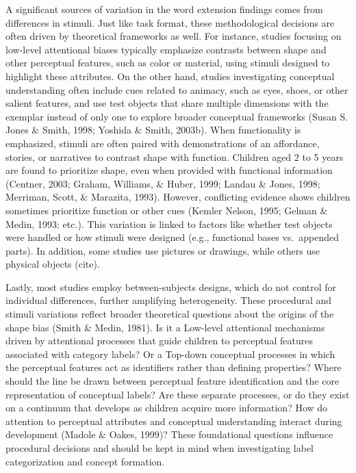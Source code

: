 \documentclass[10pt, letterpaper]{article}
\begin{document}
A significant sources of variation in the word extension findings comes
from differences in stimuli. Just like task format, these methodological
decisions are often driven by theoretical frameworks as well. For
instance, studies focusing on low-level attentional biases typically
emphasize contrasts between shape and other perceptual features, such as
color or material, using stimuli designed to highlight these attributes.
On the other hand, studies investigating conceptual understanding often
include cues related to animacy, such as eyes, shoes, or other salient
features, and use test objects that share multiple dimensions with the
exemplar instead of only one to explore broader conceptual frameworks
(Susan S. Jones \& Smith, 1998; Yoshida \& Smith, 2003b). When
functionality is emphasized, stimuli are often paired with
demonstrations of an affordance, stories, or narratives to contrast
shape with function. Children aged 2 to 5 years are found to prioritize
shape, even when provided with functional information (Centner, 2003;
Graham, Williams, \& Huber, 1999; Landau \& Jones, 1998; Merriman,
Scott, \& Marazita, 1993). However, conflicting evidence shows children
sometimes prioritize function or other cues (Kemler Nelson, 1995; Gelman
\& Medin, 1993; etc.). This variation is linked to factors like whether
test objects were handled or how stimuli were designed (e.g., functional
bases vs.~appended parts). In addition, some studies use pictures or
drawings, while others use physical objects (cite).

Lastly, most studies employ between-subjects designs, which do not
control for individual differences, further amplifying heterogeneity.
These procedural and stimuli variations reflect broader theoretical
questions about the origins of the shape bias (Smith \& Medin, 1981). Is
it a Low-level attentional mechanisms driven by attentional processes
that guide children to perceptual features associated with category
labels? Or a Top-down conceptual processes in which the perceptual
features act as identifiers rather than defining properties? Where
should the line be drawn between perceptual feature identification and
the core representation of conceptual labels? Are these separate
processes, or do they exist on a continuum that develops as children
acquire more information? How do attention to perceptual attributes and
conceptual understanding interact during development (Madole \& Oakes,
1999)? These foundational questions influence procedural decisions and
should be kept in mind when investigating label categorization and
concept formation.
\end{document}
